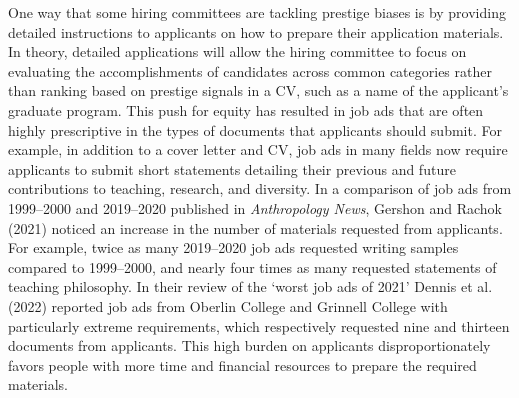 \documentclass[
  12pt,
]{article}
\begin{document}
One way that some hiring committees are tackling prestige biases is by
providing detailed instructions to applicants on how to prepare their
application materials. In theory, detailed applications will allow the
hiring committee to focus on evaluating the accomplishments of
candidates across common categories rather than ranking based on
prestige signals in a CV, such as a name of the applicant's graduate
program. This push for equity has resulted in job ads that are often
highly prescriptive in the types of documents that applicants should
submit. For example, in addition to a cover letter and CV, job ads in
many fields now require applicants to submit short statements detailing
their previous and future contributions to teaching, research, and
diversity. In a comparison of job ads from 1999--2000 and 2019--2020
published in \emph{Anthropology News}, Gershon and Rachok (2021) noticed
an increase in the number of materials requested from applicants. For
example, twice as many 2019--2020 job ads requested writing samples
compared to 1999--2000, and nearly four times as many requested
statements of teaching philosophy. In their review of the `worst job ads
of 2021' Dennis et al. (2022) reported job ads from Oberlin College and
Grinnell College with particularly extreme requirements, which
respectively requested nine and thirteen documents from applicants. This
high burden on applicants disproportionately favors people with more
time and financial resources to prepare the required materials.
\end{document}
